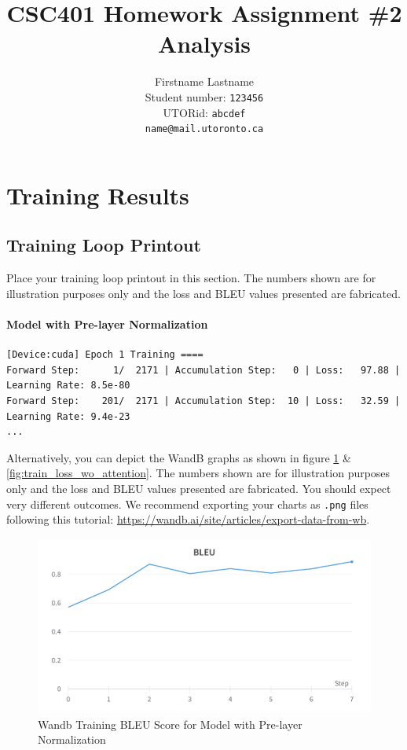\documentclass[11pt]{article}
\title{CSC401 Homework Assignment \#2\\Analysis}
\author{Firstname Lastname \\
  Student number: \texttt{123456} \\
  UTORid: \texttt{abcdef} \\
  \texttt{name@mail.utoronto.ca}}
\begin{document}
\maketitle

\section{Training Results}

\subsection{Training Loop Printout}
Place your training loop printout in this section. The numbers shown are for illustration purposes only and the loss and BLEU values presented are fabricated.

\paragraph{Model with Pre-layer Normalization}
\begin{small}
\begin{verbatim}
[Device:cuda] Epoch 1 Training ====
Forward Step:      1/  2171 | Accumulation Step:   0 | Loss:   97.88 | Learning Rate: 8.5e-80
Forward Step:    201/  2171 | Accumulation Step:  10 | Loss:   32.59 | Learning Rate: 9.4e-23
...
\end{verbatim}
\end{small}

\vspace{2em}

Alternatively, you can depict the WandB graphs as shown in figure \ref{fig:train_bleu_wo_attention} \& \ref{fig:train_loss_wo_attention}. The numbers shown are for illustration purposes only and the loss and BLEU values presented are fabricated. You should expect very different outcomes.  We recommend exporting your charts as {\tt .png} files following this tutorial: \url{https://wandb.ai/site/articles/export-data-from-wb}.

\begin{figure}[hbt!]
\centering
\includegraphics[width=0.65\linewidth]{./wandb_bleu.png}
\caption{Wandb Training BLEU Score for Model with Pre-layer Normalization}
\label{fig:train_bleu_wo_attention}
\end{figure}
\end{document}
